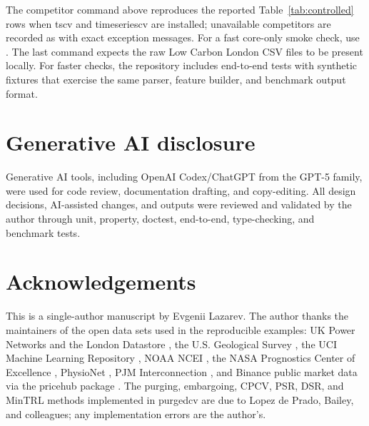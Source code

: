 \documentclass[11pt]{article}
\newcommand{\pcv}{\textsf{purgedcv}}
\newcommand{\pkg}[1]{\textsf{#1}}
\DeclareRobustCommand{\code}[1]{\texttt{\detokenize{#1}}}
\begin{document}
The competitor command above reproduces the reported Table~\ref{tab:controlled}
rows when \pkg{tscv} and \pkg{timeseriescv} are installed; unavailable
competitors are recorded as \code{NOT RUN} with exact exception messages. For a
fast core-only smoke check, use \code{--core-only}. The last command expects the
raw Low Carbon London CSV files to be present locally. For faster checks, the
repository includes end-to-end tests with synthetic fixtures that exercise the
same parser, feature builder, and benchmark output format.

\section*{Generative AI disclosure}

Generative AI tools, including OpenAI Codex/ChatGPT from the GPT-5 family, were
used for code review, documentation drafting, and copy-editing. All design
decisions, AI-assisted changes, and outputs were reviewed and validated by the
author through unit, property, doctest, end-to-end, type-checking, and benchmark
tests.

\section*{Acknowledgements}

This is a single-author manuscript by Evgenii Lazarev. The author thanks the
maintainers of the open data sets used in the reproducible examples: UK Power
Networks and the London Datastore \citep{ukpn_lcl}, the U.S. Geological Survey
\citep{usgs_catalog}, the UCI Machine Learning Repository
\citep{devito2008airquality}, NOAA NCEI \citep{noaa_ghcnd}, the NASA Prognostics
Center of Excellence \citep{nasa_cmapss}, PhysioNet
\citep{physionet2012goldberger,physionet2012silva}, PJM Interconnection
\citep{pjm_load}, and Binance public market data via the \pkg{pricehub} package
\citep{binance_pricehub}. The purging, embargoing, CPCV, PSR, DSR, and MinTRL
methods implemented in \pcv{} are due to Lopez de Prado, Bailey, and colleagues;
any implementation errors are the author's.



\end{document}
